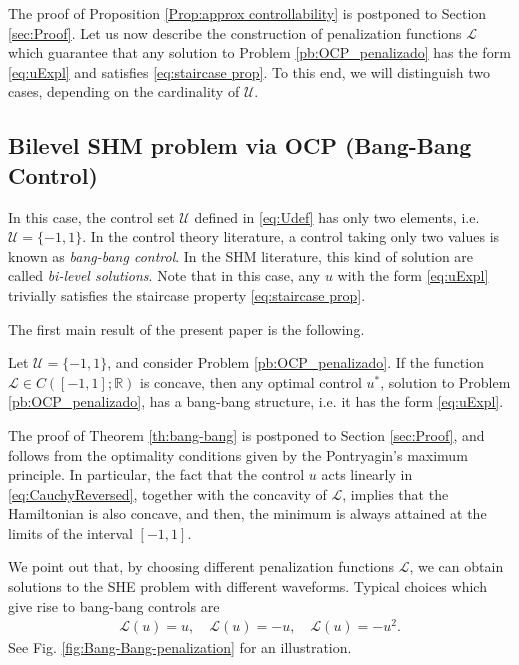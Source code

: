 \documentclass[twocolumn]{autart}    %
\begin{document}
The proof of Proposition \ref{Prop:approx controllability} is postponed to Section \ref{sec:Proof}. Let us now describe the construction of penalization functions $\mathcal{L}$ which guarantee that any solution to Problem \ref{pb:OCP_penalizado} has the form \eqref{eq:uExpl} and satisfies \eqref{eq:staircase prop}. To this end, we will distinguish two cases, depending on the cardinality of $\mathcal{U}$.

\subsection{Bilevel SHM problem via OCP (Bang-Bang Control)} 

In this case, the control set $\mathcal{U}$ defined in \eqref{eq:Udef} has only two elements, i.e.  $\mathcal{U}=\{-1,1\}$.
In the control theory literature, a control taking only two values is known as \emph{bang-bang control}. In the SHM literature, this kind of solution are called \textit{bi-level solutions}. Note that in this case, any $u$ with the form \eqref{eq:uExpl}  trivially satisfies the staircase property \eqref{eq:staircase prop}.

The first main result of the present paper is the following.

\bigskip
\begin{theorem}\label{th:bang-bang}
Let $\mathcal{U}=\{ -1, 1\}$, and consider Problem \ref{pb:OCP_penalizado}. If the function $\mathcal{L}\in C([-1,1];\mathbb{R})$ is concave, then any optimal control $u^\ast$, solution to Problem \ref{pb:OCP_penalizado}, has a bang-bang structure, i.e. it has the form \eqref{eq:uExpl}.
\end{theorem}

The proof of Theorem \ref{th:bang-bang} is postponed to Section \ref{sec:Proof}, and follows from the optimality conditions given by the Pontryagin's maximum principle. In particular, the fact that the control $u$ acts linearly in \eqref{eq:CauchyReversed}, together with the concavity of $\mathcal{L}$, implies that the Hamiltonian is also concave, and then, the minimum is always attained at the limits of the interval $[-1,1]$.

We point out that, by choosing different penalization functions $\mathcal{L}$, we can obtain solutions to the SHE problem with different waveforms.
Typical choices which give rise to bang-bang controls are 
\begin{align*}
	\mathcal{L}(u) = u,  \quad \mathcal{L}(u) = -u,  \quad \mathcal{L}(u) = -u^2.
\end{align*} 
See Fig. \ref{fig:Bang-Bang-penalization} for an illustration.
\end{document}
